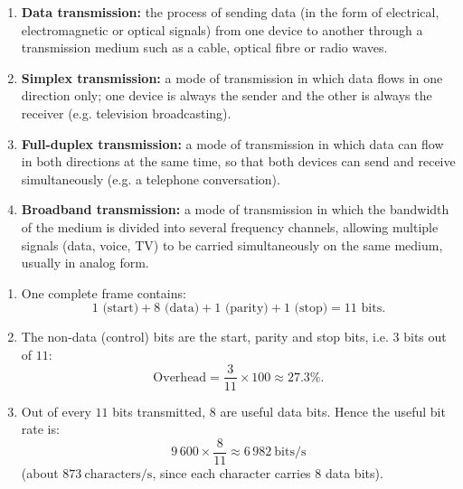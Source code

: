 \documentclass[11pt]{article}
\begin{document}
\begin{corrige}
\begin{enumerate}
\item \textbf{Data transmission:} the process of sending data (in the form of electrical, electromagnetic or optical signals) from one device to another through a transmission medium such as a cable, optical fibre or radio waves.
\item \textbf{Simplex transmission:} a mode of transmission in which data flows in one direction only; one device is always the sender and the other is always the receiver (e.g. television broadcasting).
\item \textbf{Full-duplex transmission:} a mode of transmission in which data can flow in both directions at the same time, so that both devices can send and receive simultaneously (e.g. a telephone conversation).
\item \textbf{Broadband transmission:} a mode of transmission in which the bandwidth of the medium is divided into several frequency channels, allowing multiple signals (data, voice, TV) to be carried simultaneously on the same medium, usually in analog form.
\end{enumerate}
\end{corrige}

\begin{corrige}
\begin{enumerate}
\item One complete frame contains:
\[ 1 \text{ (start)} + 8 \text{ (data)} + 1 \text{ (parity)} + 1 \text{ (stop)} = 11 \text{ bits}. \]
\item The non-data (control) bits are the start, parity and stop bits, i.e. $3$ bits out of $11$:
\[ \text{Overhead} = \frac{3}{11} \times 100 \approx 27.3\%. \]
\item Out of every $11$ bits transmitted, $8$ are useful data bits. Hence the useful bit rate is:
\[ 9\,600 \times \frac{8}{11} \approx 6\,982\ \mathrm{bits/s} \]
(about $873\ \mathrm{characters/s}$, since each character carries 8 data bits).
\end{enumerate}
\end{corrige}
\end{document}
